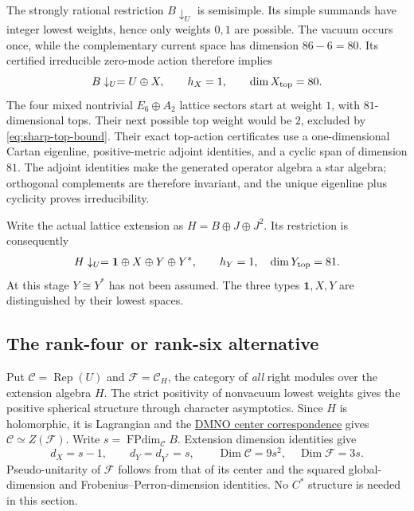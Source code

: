 The strongly rational restriction $B\downarrow_U$ is semisimple. Its
simple summands have integer lowest weights, hence only weights $0,1$
are possible. The vacuum occurs once, while the complementary current
space has dimension $86-6=80$. Its certified irreducible zero-mode
action therefore implies
\begin{equation}
 B\downarrow_U=U\oplus X,\qquad h_X=1,\qquad\dim X_{\rm top}=80.
 \label{eq:B-branching}
\end{equation}
The four mixed nontrivial $E_6\oplus A_2$ lattice sectors start at
weight $1$, with $81$-dimensional tops. Their next possible top weight
would be $2$, excluded by \eqref{eq:sharp-top-bound}. Their exact
top-action certificates use a one-dimensional Cartan eigenline,
positive-metric adjoint identities, and a cyclic span of dimension
$81$. The adjoint identities make the generated operator algebra a
star algebra; orthogonal complements are therefore invariant, and
the unique eigenline plus cyclicity proves irreducibility.

Write the actual lattice extension as $H=B\oplus J\oplus J^2$. Its
restriction is consequently
\begin{equation}
 H\downarrow_U=\mathbf1\oplus X\oplus Y\oplus Y^*,\qquad
 h_Y=1,\quad\dim Y_{\rm top}=81.
 \label{eq:H-branching-fork}
\end{equation}
At this stage $Y\cong Y^*$ has not been assumed. The three types
$\mathbf1,X,Y$ are distinguished by their lowest spaces.

\subsection{The rank-four or rank-six alternative}

Put $\mathcal C=\operatorname{Rep}(U)$ and
$\mathcal F=\mathcal C_H$, the category of \emph{all} right modules
over the extension algebra $H$. The strict positivity of nonvacuum
lowest weights gives the positive spherical structure through character
asymptotics. Since $H$ is holomorphic, it is Lagrangian and the
\href{https://arxiv.org/abs/1009.2117}{DMNO center correspondence}
gives $\mathcal C\simeq Z(\mathcal F)$.
Write $s=\operatorname{FPdim}_{\mathcal C}B$. Extension dimension
identities give
\[
 d_X=s-1,\qquad d_Y=d_{Y^*}=s,\qquad
 \operatorname{Dim}\mathcal C=9s^2,\quad
 \operatorname{Dim}\mathcal F=3s.
\]
Pseudo-unitarity of $\mathcal F$ follows from that of its center and
the squared global-dimension and Frobenius--Perron-dimension identities.
No $C^*$ structure is needed in this section.

